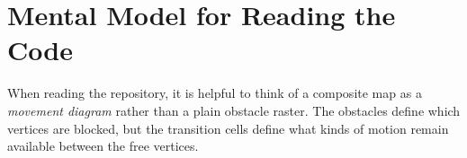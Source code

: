 \documentclass[11pt]{article}
\begin{document}
\section{Mental Model for Reading the Code}

When reading the repository, it is helpful to think of a composite map as a \emph{movement diagram} rather than a plain obstacle raster. The obstacles define which vertices are blocked, but the transition cells define what kinds of motion remain available between the free vertices.
\end{document}
